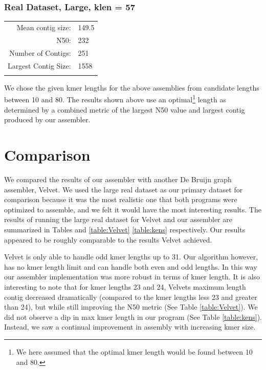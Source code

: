 \documentclass[12pt]{article}
\begin{document}
\begin{center}
\subsubsection*{Real Dataset, Large, klen = 57}

\begin{tabular}{rl} \hline
Mean contig size: & 149.5 \\
N50: &  232\\
Number of Contigs: & 251\\
Largest Contig Size: & 1558\\
\label{table:real_large}
\end{tabular}

\end{center}

We chose the given kmer lengths for the above assemblies from candidate lengths between 10 and 80.  The results shown above use an optimal\footnote{We here assumed that the optimal kmer length would be found between 10 and 80.} length as determined by a combined metric of the largest N50 value and largest contig produced by our assembler.

\section{Comparison}
We compared the results of our assembler with another De Bruijn graph assembler, Velvet. We used the large real dataset as our primary dataset for comparison because it was the most realistic one that both programs were optimized to assemble, and we felt it would have the most interesting results. The results of running the large real dataset for Velvet and our assembler are summarized in Tables and \ref{table:Velvet} \ref{table:kens} respectively. Our results appeared to be roughly comparable to the results Velvet achieved.

Velvet is only able to handle odd kmer lengths up to 31. Our algorithm however, has no kmer length limit and can handle both even and odd lengths. In this way our assembler implementation was more robust in terms of kmer length. It is also interesting to note that for kmer lengths 23 and 24, Velvets maximum length contig decreased dramatically (compared to the kmer lengths less 23 and greater than 24), but while still improving the N50 metric (See Table \ref{table:Velvet}). We did not observe a dip in max kmer length in our program (See Table \ref{table:kens}). Instead, we saw a continual improvement in assembly with increasing kmer size.
\end{document}
